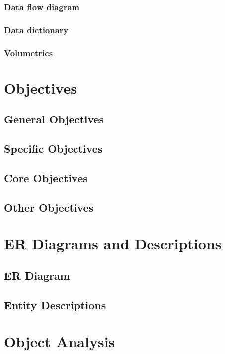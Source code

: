 \subsubsection{Data flow diagram}

\subsubsection{Data dictionary}

\subsubsection{Volumetrics}

\section{Objectives}

\subsection{General Objectives}

\subsection{Specific Objectives}

\subsection{Core Objectives}

\subsection{Other Objectives}

\section{ER Diagrams and Descriptions}

\subsection{ER Diagram}

\subsection{Entity Descriptions}

\section{Object Analysis}

